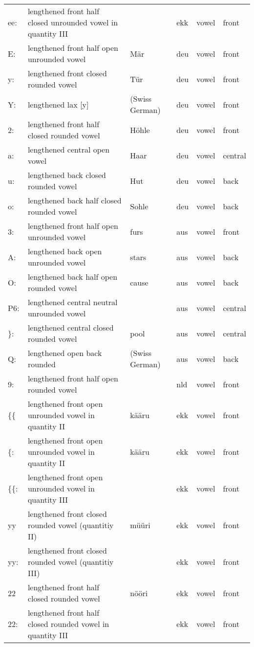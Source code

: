 {\begin{longtable}{l|p{.3\linewidth}|p{.15\linewidth}|l|p{.15\linewidth}|l}
	ee:	& lengthened front half closed unrounded vowel in quantity III	& 	& ekk	& vowel	& front	\\
	E:\	& lengthened front half open unrounded vowel	& M\"ar	& deu	& vowel	& front	\\
	y:	& lengthened front closed rounded vowel	& Tür	& deu	& vowel	& front	\\
	Y:\	& lengthened lax [y]	& (Swiss German)	& deu	& vowel	& front	\\
	2:	& lengthened front half closed rounded vowel	& Höhle	& deu	& vowel	& front	\\
	a:	& lengthened central open vowel	& Haar	& deu	& vowel	& central	\\
	u:	& lengthened back closed rounded vowel	& Hut	& deu	& vowel	& back	\\
	o:	& lengthened back half closed rounded vowel	& Sohle	& deu	& vowel	& back	\\
	3:	& lengthened front half open unrounded vowel	& furs	& aus	& vowel	& front	\\
	A:\	& lengthened back open unrounded vowel	& stars	& aus	& vowel	& back	\\
	O:\	& lengthened back half open rounded vowel	& cause	& aus	& vowel	& back	\\
	P6:	& lengthened central neutral unrounded vowel	& 	& aus	& vowel	& central	\\
	\}:	& lengthened central closed rounded vowel	& pool	& aus	& vowel	& central	\\
	Q:\	& lengthened open back rounded	& (Swiss German)	& aus	& vowel	& back	\\
	9:	& lengthened front half open rounded vowel	& 	& nld	& vowel	& front	\\
	\{\{	& lengthened front open unrounded vowel in quantity II	& kääru	& ekk	& vowel	& front	\\
	\{:	& lengthened front open unrounded vowel in quantity II	& kääru	& ekk	& vowel	& front	\\
	\{\{:	& lengthened front open unrounded vowel in quantity III	& 	& ekk	& vowel	& front	\\
	yy	& lengthened front closed rounded vowel (quantitiy II)	& müüri	& ekk	& vowel	& front	\\
	yy:	& lengthened front closed rounded vowel (quantitiy III)	& 	& ekk	& vowel	& front	\\
	22	& lengthened front half closed rounded vowel	& nööri	& ekk	& vowel	& front	\\
	22:	& lengthened front half closed rounded vowel in quantity III	& 	& ekk	& vowel	& front	\\

\end{longtable}}
